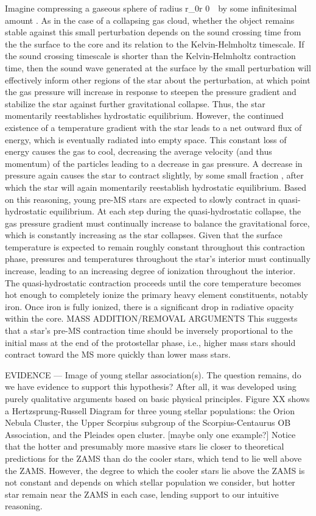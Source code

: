 Imagine compressing a gaseous sphere of radius r_0r 
0
​	 ​ by some infinitesimal amount ​. As in the case of a collapsing gas cloud, whether the object remains stable against this small perturbation depends on the sound crossing time from the the surface to the core and its relation to the Kelvin-Helmholtz timescale. If the sound crossing timescale is shorter than the Kelvin-Helmholtz contraction time, then the sound wave generated at the surface by the small perturbation will effectively inform other regions of the star about the perturbation, at which point the gas pressure will increase in response to steepen the pressure gradient and stabilize the star against further gravitational collapse. Thus, the star momentarily reestablishes hydrostatic equilibrium. 
However, the continued existence of a temperature gradient with the star leads to a net outward flux of energy, which is eventually radiated into empty space. This constant loss of energy causes the gas to cool, decreasing the average velocity (and thus momentum) of the particles leading to a decrease in gas pressure. A decrease in pressure again causes the star to contract slightly, by some small fraction ​, after which the star will again momentarily reestablish hydrostatic equilibrium. Based on this reasoning, young pre-MS stars are expected to slowly contract in quasi-hydrostatic equilibrium.
At each step during the quasi-hydrostatic collapse, the gas pressure gradient must continually increase to balance the gravitational force, which is constantly increasing as the star collapses. Given that the surface temperature is expected to remain roughly constant throughout this contraction phase, pressures and temperatures throughout the star's interior must continually increase, leading to an increasing degree of ionization throughout the interior. The quasi-hydrostatic contraction proceeds until the core temperature becomes hot enough to completely ionize the primary heavy element constituents, notably iron. Once iron is fully ionized, there is a significant drop in radiative opacity within the core. 
MASS ADDITION/REMOVAL ARGUMENTS
This suggests that a star's pre-MS contraction time should be inversely proportional to the initial mass at the end of the protostellar phase, i.e., higher mass stars should contract toward the MS more quickly than lower mass stars. 

EVIDENCE --- Image of young stellar association(s).
The question remains, do we have evidence to support this hypothesis? After all, it was developed using purely qualitative arguments based on basic physical principles. Figure XX shows a Hertzsprung-Russell Diagram for three young stellar populations: the Orion Nebula Cluster, the Upper Scorpius subgroup of the Scorpius-Centaurus OB Association, and the Pleiades open cluster. [maybe only one example?] Notice that the hotter and presumably more massive stars lie closer to theoretical predictions for the ZAMS than do the cooler stars, which tend to lie well above the ZAMS. However, the degree to which the cooler stars lie above the ZAMS is not constant and depends on which stellar population we consider, but hotter star remain near the ZAMS in each case, lending support to our intuitive reasoning.